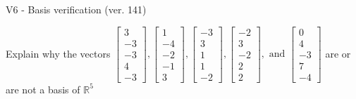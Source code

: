 \begin{exercise}
  \begin{exerciseTitle}V6 - Basis verification (ver. 141)\end{exerciseTitle}
  \begin{exerciseStatement}
    Explain why the vectors \(\left[\begin{array}{r}
3 \\
-3 \\
-3 \\
4 \\
-3
\end{array}\right] , \left[\begin{array}{r}
1 \\
-4 \\
-2 \\
-1 \\
3
\end{array}\right] , \left[\begin{array}{r}
-3 \\
3 \\
1 \\
1 \\
-2
\end{array}\right] , \left[\begin{array}{r}
-2 \\
3 \\
-2 \\
2 \\
2
\end{array}\right] , \text{ and } \left[\begin{array}{r}
0 \\
4 \\
-3 \\
7 \\
-4
\end{array}\right]\) are or are not a basis of \(\mathbb{R}^5\)	



\end{exerciseStatement}
\end{exercise}
